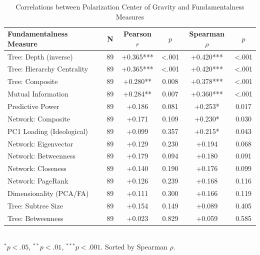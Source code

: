 \begin{table}[htbp]
\centering
\small
\caption{Correlations between Polarization Center of Gravity and Fundamentalness Measures}
\label{tab:cog_correlations}
\begin{tabular}{lccccc}
\toprule
Fundamentalness Measure & N & Pearson $r$ & $p$ & Spearman $\rho$ & $p$ \\
\midrule
Tree:  Depth (inverse) & 89 & +0.365*** & <.001 & +0.420*** & <.001 \\
Tree:  Hierarchy Centrality & 89 & +0.365*** & <.001 & +0.420*** & <.001 \\
Tree:  Composite & 89 & +0.280** & 0.008 & +0.378*** & <.001 \\
Mutual Information & 89 & +0.284** & 0.007 & +0.360*** & <.001 \\
Predictive Power & 89 & +0.186 & 0.081 & +0.253* & 0.017 \\
Network:  Composite & 89 & +0.171 & 0.109 & +0.230* & 0.030 \\
PC1 Loading (Ideological) & 89 & +0.099 & 0.357 & +0.215* & 0.043 \\
Network:  Eigenvector & 89 & +0.129 & 0.230 & +0.194 & 0.068 \\
Network:  Betweenness & 89 & +0.179 & 0.094 & +0.180 & 0.091 \\
Network:  Closeness & 89 & +0.140 & 0.190 & +0.176 & 0.099 \\
Network:  PageRank & 89 & +0.126 & 0.239 & +0.168 & 0.116 \\
Dimensionality (PCA/FA) & 89 & +0.111 & 0.300 & +0.166 & 0.119 \\
Tree:  Subtree Size & 89 & +0.154 & 0.149 & +0.089 & 0.405 \\
Tree:  Betweenness & 89 & +0.023 & 0.829 & +0.059 & 0.585 \\
\bottomrule
\end{tabular}
\\[0.3em]
\footnotesize{$^*p < .05$, $^{**}p < .01$, $^{***}p < .001$. Sorted by Spearman $\rho$.}
\end{table}
